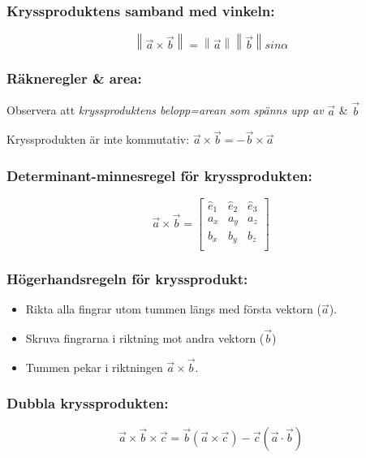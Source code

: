 \documentclass{article}
\newenvironment{ankiflashcard}[1]{}{}
\begin{document}
\begin{paracol}{2}
\subsubsection{Kryssproduktens samband med vinkeln:}
$$
\boxed{
\left\|\vec a \times \vec b \right\|=\left\|\vec a \right\|\left\|\vec b \right\|sin\alpha
}
$$

\subsubsection{Räkneregler \& area:}
Observera att \textit{kryssproduktens belopp=arean som spänns upp av } $\vec a$ \& $\vec b$


Kryssprodukten är inte kommutativ: $\vec a \times \vec b = -\vec b \times \vec a$

\subsubsection{Determinant-minnesregel för kryssprodukten:}
$$
\vec a \times \vec b =
\begin{bmatrix}
\hat e_1&\hat e_2&\hat e_3\\
a_x&a_y&a_z\\
b_x&b_y&b_z\\
\end{bmatrix}
$$
\subsubsection{Högerhandsregeln för kryssprodukt:}
\begin{itemize}
    \item Rikta alla fingrar utom tummen längs med första vektorn ($\vec a$).
    \item  Skruva fingrarna i riktning mot andra vektorn ($\vec b$)
    \item Tummen pekar i riktningen $\vec a\times\vec b$.
    
\end{itemize}

\begin{ankiflashcard}{Ange formeln för dubbla kryssprodukten.}
\subsubsection{Dubbla kryssprodukten:}
$$
\vec a \times \vec b \times \vec c =\vec b(\vec a \times \vec c)-\vec c(\vec a \cdot \vec b)
$$
\end{ankiflashcard}


\end{paracol}
\end{document}
